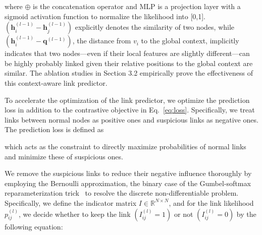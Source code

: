 \noindent where $\oplus$ is the concatenation operator and MLP is a projection layer with a sigmoid activation function to normalize the likelihood into [0,1]. 
$(\boldsymbol{h}_i^{(l-1)} - \boldsymbol{h}_j^{(l-1)})$ explicitly denotes the similarity of two nodes,
while $(\boldsymbol{h}_{i}^{(l-1)} - \boldsymbol{q}^{(l-1)})$, the distance from $v_{i}$ to the global context, implicitly indicates that two nodes---even if their local features are slightly different---can be highly probably linked  given their relative positions to the global context are similar. The ablation studies in Section 3.2 empirically prove the effectiveness of this context-aware link predictor.

To accelerate the optimization of the link predictor, we optimize the prediction loss in addition to the contrastive objective in Eq.~\eqref{eq:loss}. Specifically, we treat links between normal nodes as positive ones and suspicious links as negative ones. The prediction loss is defined as


\noindent which acts as the constraint to directly maximize probabilities of normal links and minimize these of suspicious ones.  



We remove the suspicious links to reduce their negative influence thoroughly by employing the Bernoulli approximation, the binary case of the Gumbel-softmax reparameterization trick~\cite{maddison2016concrete, jang2016categorical} to resolve the discrete non-differentiable problem.
Specifically, we define the indicator matrix $I \in \mathbb{R}^{N \times N}$, and for the link likelihood $p_{ij}^{(l)}$, 
we decide whether to keep the link $(I^{(l)}_{ij} = 1)$ or not $(I^{(l)}_{ij}=0)$ by the following equation: 

